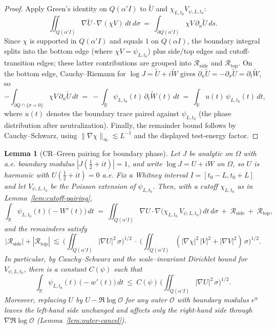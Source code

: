 \documentclass[11pt]{article}
\newtheorem{lemma}[theorem]{Lemma}
\theoremstyle{definition}
\theoremstyle{remark}
\theoremstyle{definition}
\newcommand{\R}{\mathbb{R}}
\begin{document}
\begin{proof}
Apply Green's identity on $Q(\alpha'I)$ to $\widetilde U$ and $\chi_{L,t_0}V_{\psi,L,t_0}$:
\[
  \iint_{Q(\alpha'I)} \nabla \widetilde U\cdot \nabla(\chi V)\,dt\,d\sigma
  \ =\ \int_{\partial Q(\alpha'I)} \chi V\,\partial_n \widetilde U\,ds.
\]
Since $\chi$ is supported in $Q(\alpha'I)$ and equals $1$ on $Q(\alpha I)$, the boundary integral splits into the bottom edge (where $\chi V=\psi_{L,t_0}$) plus side/top edges and cutoff-transition edges; these latter contributions are grouped into $\mathcal R_{\mathrm{side}}$ and $\mathcal R_{\mathrm{top}}$.
On the bottom edge, Cauchy–Riemann for $\log J=\widetilde U+i\widetilde W$ gives $\partial_n \widetilde U=-\partial_\sigma \widetilde U=\partial_t \widetilde W$, so
\[
  -\int_{\partial Q\cap\{\sigma=0\}} \chi V\,\partial_n \widetilde U\,dt
  \ =\ -\int_{\R}\psi_{L,t_0}(t)\,\partial_t \widetilde W(t)\,dt
  \ =\ \int_{\R} u(t)\,\psi_{L,t_0}(t)\,dt,
\]
where $u(t)$ denotes the boundary trace paired against $\psi_{L,t_0}$ (the phase distribution after neutralization).
Finally, the remainder bound follows by Cauchy–Schwarz, using $\|\nabla\chi\|_\infty\lesssim L^{-1}$ and the displayed test-energy factor.
\end{proof}
\begin{lemma}[CR–Green pairing for boundary phase]\label{lem:CR-green-phase}
Let $J$ be analytic on $\Omega$ with a.e. boundary modulus $|J(\tfrac12+it)|=1$, and write $\log J=U+iW$ on $\Omega$, so $U$ is harmonic with $U(\tfrac12+it)=0$ a.e. Fix a Whitney interval $I=[t_0-L,t_0+L]$ and let $V_{\psi,L,t_0}$ be the Poisson extension of $\psi_{L,t_0}$. Then, with a cutoff $\chi_{L,t_0}$ as in Lemma~\ref{lem:cutoff-pairing},
\[
  \int_{\R} \psi_{L,t_0}(t)\,\big(-W'(t)\big)\,dt\ =\ \iint_{Q(\alpha'I)} \nabla U\cdot \nabla\big(\chi_{L,t_0}\,V_{\psi,L,t_0}\big)\,dt\,d\sigma\ +\ \mathcal R_{\mathrm{side}}\ +\ \mathcal R_{\mathrm{top}},
\]
and the remainders satisfy
\[
  |\mathcal R_{\mathrm{side}}|+|\mathcal R_{\mathrm{top}}|\ \lesssim\ \Big(\iint_{Q(\alpha'I)} |\nabla U|^2\,\sigma\Big)^{1/2}\ \cdot\ \Big(\iint_{Q(\alpha'I)} (|\nabla\chi|^2\,|V|^2+|\nabla V|^2)\,\sigma\Big)^{1/2}.
\]
In particular, by Cauchy–Schwarz and the scale–invariant Dirichlet bound for $V_{\psi,L,t_0}$, there is a constant $C(\psi)$ such that
\[
  \int_{\R} \psi_{L,t_0}(t)\,\big(-w'(t)\big)\,dt\ \le\ C(\psi)\,\Big(\iint_{Q(\alpha'I)} |\nabla U|^2\,\sigma\Big)^{1/2}.
\]
Moreover, replacing $U$ by $U-\Re\log\mathcal O$ for any outer $\mathcal O$ with boundary modulus $e^{u}$ leaves the left-hand side unchanged and affects only the right-hand side through $\nabla\Re\log\mathcal O$ (Lemma~\ref{lem:outer-cancel}).
\end{lemma}
\end{document}
